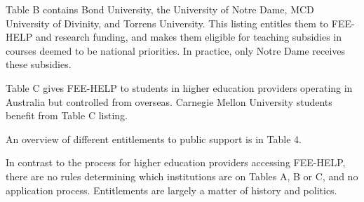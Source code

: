 \documentclass{grattan}
\begin{document}
Table B contains Bond University, the University of Notre Dame, MCD University of Divinity, and Torrens University. This listing entitles them to FEE-HELP and research funding, and makes them eligible for teaching subsidies in courses deemed to be national priorities. In practice, only Notre Dame receives these subsidies.

Table C gives FEE-HELP to students in higher education providers operating in Australia but controlled from overseas. Carnegie Mellon University students benefit from Table C listing.

An overview of different entitlements to public support is in Table 4.

In contrast to the process for higher education providers accessing FEE-HELP, there are no rules determining which institutions are on Tables A, B or C, and no application process. Entitlements are largely a matter of history and politics.

\begin{table} \caption{Overview of funding eligibility}


\end{table}
\end{document}
